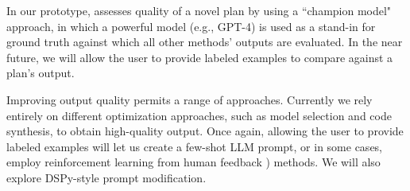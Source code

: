 In our prototype, \system{} assesses quality of a novel plan by 
using a ``champion model" approach, in which a powerful model (e.g., GPT-4) is used as a stand-in for ground truth against which all other methods' outputs are evaluated. In the near future, we will allow the user to provide labeled examples to compare against a plan's output.

Improving output quality permits a range of approaches.  Currently we rely entirely on different optimization approaches, such as model selection and code synthesis, to obtain high-quality output.  Once again, allowing the user to provide labeled examples will let us create a few-shot LLM prompt, or in some cases, employ reinforcement learning from human feedback \cite{ouyang2022training, rafailov2023direct}) methods.  We will also explore DSPy-style prompt modification.




